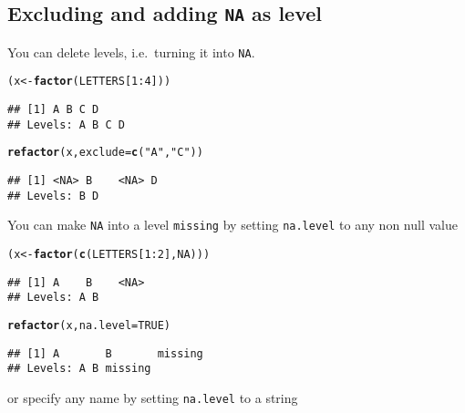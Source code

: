 \documentclass{article}\usepackage[]{graphicx}\usepackage[]{color}
\makeatletter
\newcommand{\hlnum}[1]{\textcolor[rgb]{0.686,0.059,0.569}{#1}}%
\newcommand{\hlstr}[1]{\textcolor[rgb]{0.192,0.494,0.8}{#1}}%
\newcommand{\hlopt}[1]{\textcolor[rgb]{0,0,0}{#1}}%
\newcommand{\hlstd}[1]{\textcolor[rgb]{0.345,0.345,0.345}{#1}}%
\newcommand{\hlkwb}[1]{\textcolor[rgb]{0.69,0.353,0.396}{#1}}%
\newcommand{\hlkwc}[1]{\textcolor[rgb]{0.333,0.667,0.333}{#1}}%
\newcommand{\hlkwd}[1]{\textcolor[rgb]{0.737,0.353,0.396}{\textbf{#1}}}%
\newenvironment{kframe}{%
 \def\at@end@of@kframe{}%
 \ifinner\ifhmode%
  \def\at@end@of@kframe{\end{minipage}}%
  \begin{minipage}{\columnwidth}%
 \fi\fi%
 \def\FrameCommand##1{\hskip\@totalleftmargin \hskip-\fboxsep
 \colorbox{shadecolor}{##1}\hskip-\fboxsep
     \hskip-\linewidth \hskip-\@totalleftmargin \hskip\columnwidth}%
 \MakeFramed {\advance\hsize-\width
   \@totalleftmargin\z@ \linewidth\hsize
   \@setminipage}}%
 {\par\unskip\endMakeFramed%
 \at@end@of@kframe}
\newenvironment{knitrout}{}{} %
\newcommand{\code}{\texttt}
\makeatother
\begin{document}
\subsection{Excluding and adding \code{NA} as level}
You can delete levels, i.e.\ turning it into \code{NA}.
\begin{knitrout}
\color{fgcolor}\begin{kframe}
\begin{alltt}
\hlstd{(x} \hlkwb{<-} \hlkwd{factor}\hlstd{(LETTERS[}\hlnum{1}\hlopt{:}\hlnum{4}\hlstd{]))}
\end{alltt}
\begin{verbatim}
## [1] A B C D
## Levels: A B C D
\end{verbatim}
\begin{alltt}
\hlkwd{refactor}\hlstd{(x,}\hlkwc{exclude}\hlstd{=}\hlkwd{c}\hlstd{(}\hlstr{"A"}\hlstd{,}\hlstr{"C"}\hlstd{))}
\end{alltt}
\begin{verbatim}
## [1] <NA> B    <NA> D   
## Levels: B D
\end{verbatim}
\end{kframe}
\end{knitrout}
You can make \code{NA} into a level \code{missing} by setting \code{na.level} to any non null value
\begin{knitrout}
\color{fgcolor}\begin{kframe}
\begin{alltt}
\hlstd{(x} \hlkwb{<-} \hlkwd{factor}\hlstd{(}\hlkwd{c}\hlstd{(LETTERS[}\hlnum{1}\hlopt{:}\hlnum{2}\hlstd{],}\hlnum{NA}\hlstd{)))}
\end{alltt}
\begin{verbatim}
## [1] A    B    <NA>
## Levels: A B
\end{verbatim}
\begin{alltt}
\hlkwd{refactor}\hlstd{(x,}\hlkwc{na.level}\hlstd{=}\hlnum{TRUE}\hlstd{)}
\end{alltt}
\begin{verbatim}
## [1] A       B       missing
## Levels: A B missing
\end{verbatim}
\end{kframe}
\end{knitrout}
or specify any name by setting \code{na.level} to a string
\end{document}
